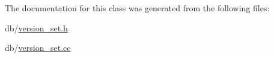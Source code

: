 The documentation for this class was generated from the following files\-:\begin{DoxyCompactItemize}
\item 
db/\hyperlink{version__set_8h}{version\-\_\-set.\-h}\item 
db/\hyperlink{version__set_8cc}{version\-\_\-set.\-cc}\end{DoxyCompactItemize}
